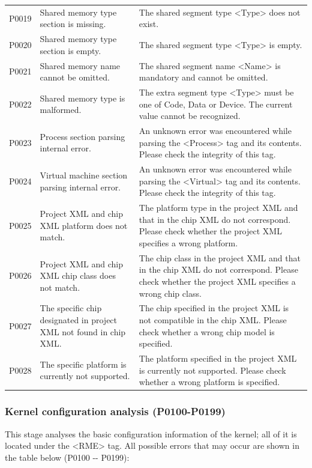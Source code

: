 \begin{xltabular}{\textwidth}{@{}>{\hsize\raggedright\arraybackslash}X>{\hsize\raggedright\arraybackslash}X>{\hsize\raggedright\arraybackslash}X@{}}
P0019 & Shared memory type section is missing. &
The shared segment type <Type> does not exist.\tabularnewline
P0020 & Shared memory type section is empty. &
The shared segment type <Type> is empty.\tabularnewline
P0021 & Shared memory name cannot be omitted. &
The shared segment name <Name> is mandatory and cannot be omitted.\tabularnewline
P0022 & Shared memory type is malformed. &
The extra segment type <Type> must be one of Code, Data or Device. The current value cannot be recognized.\tabularnewline
P0023 & Process section parsing internal error. &
An unknown error was encountered while parsing the <Process> tag and its contents. Please check the integrity of this tag.\tabularnewline
P0024 & Virtual machine section parsing internal error. &
An unknown error was encountered while parsing the <Virtual> tag and its contents. Please check the integrity of this tag.\tabularnewline
P0025 & Project XML and chip XML platform does not match. &
The platform type in the project XML and that in the chip XML do not correspond. Please check whether the project XML specifies a wrong platform.\tabularnewline
P0026 & Project XML and chip XML chip class does not match. &
The chip class in the project XML and that in the chip XML do not correspond. Please check whether the project XML specifies a wrong chip class.\tabularnewline
P0027 & The specific chip designated in project XML not found in chip
XML. &
The chip specified in the project XML is not compatible in the chip XML. Please check whether a wrong chip model is specified.\tabularnewline
P0028 & The specific platform is currently not supported. &
The platform specified in the project XML is currently not supported. Please check whether a wrong platform is specified.\tabularnewline
\end{xltabular}

\subsubsection{Kernel configuration analysis (P0100-P0199)}\label{subsubsec:5-6-2-2}

This stage analyses the basic configuration information of the kernel; all of it is located under the <RME> tag. All possible errors that may occur are shown in the table below (P0100
-\/- P0199):

